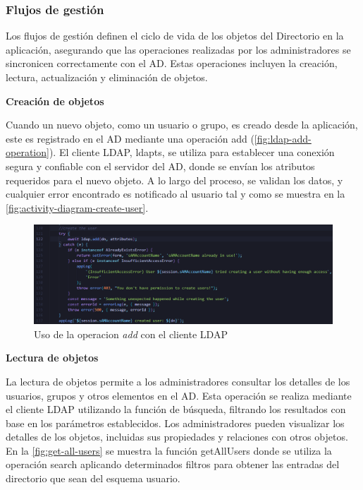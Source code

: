 \subsubsection{Flujos de gestión}

Los flujos de gestión definen el ciclo de vida de los objetos del Directorio en la aplicación, asegurando que las operaciones realizadas por los administradores se sincronicen correctamente con el AD. Estas operaciones incluyen la creación, lectura, actualización y eliminación de objetos.

\textbf{Creación de objetos}

Cuando un nuevo objeto, como un usuario o grupo, es creado desde la aplicación, este es registrado en el AD mediante una operación add (\autoref{fig:ldap-add-operation}). El cliente LDAP, ldapts, se utiliza para establecer una conexión segura y confiable con el servidor del AD, donde se envían los atributos requeridos para el nuevo objeto. A lo largo del proceso, se validan los datos, y cualquier error encontrado es notificado al usuario tal y como se muestra en la \autoref{fig:activity-diagram-create-user}.

\begin{figure}[H]
    \centering
    \includegraphics[width=\linewidth]{images/code/ldap-add-operation.png}
    \caption{Uso de la operacion \textit{add} con el cliente LDAP}
    \label{fig:ldap-add-operation}
\end{figure}

\textbf{Lectura de objetos}

La lectura de objetos permite a los administradores consultar los detalles de los usuarios, grupos y otros elementos en el AD. Esta operación se realiza mediante el cliente LDAP utilizando la función de búsqueda, filtrando los resultados con base en los parámetros establecidos. Los administradores pueden visualizar los detalles de los objetos, incluidas sus propiedades y relaciones con otros objetos. En la \autoref{fig:get-all-users} se muestra la función getAllUsers donde se utiliza la operación search aplicando determinados filtros para obtener las entradas del directorio que sean del esquema usuario.

